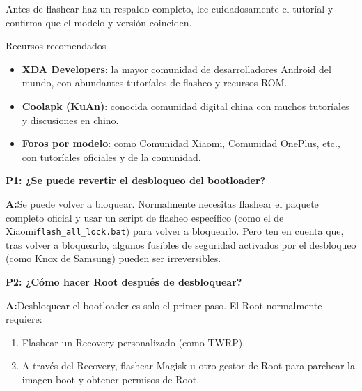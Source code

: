 Antes de flashear haz un respaldo completo, lee cuidadosamente el tutoríal y confirma que el modelo y versión coinciden.

\begin{tcbinfo}{Recursos recomendados}
\begin{itemize}
  \item \textbf{XDA Developers}: la mayor comunidad de desarrolladores Android del mundo, con abundantes tutoríales de flasheo y recursos ROM.
  \item \textbf{Coolapk (KuAn)}: conocida comunidad digital china con muchos tutoríales y discusiones en chino.
  \item \textbf{Foros por modelo}: como Comunidad Xiaomi, Comunidad OnePlus, etc., con tutoríales oficiales y de la comunidad.
\end{itemize}

\end{tcbinfo}


\textbf{P1: ¿Se puede revertir el desbloqueo del bootloader?}\par

\textbf{A:}Se puede volver a bloquear. Normalmente necesitas flashear el paquete completo oficial y usar un script de flasheo específico (como el de Xiaomi\texttt{flash\_all\_lock.\allowbreak bat}) para volver a bloquearlo. Pero ten en cuenta que, tras volver a bloquearlo, algunos fusibles de seguridad activados por el desbloqueo (como Knox de Samsung) pueden ser irreversibles.

\textbf{P2: ¿Cómo hacer Root después de desbloquear?}\par

\textbf{A:}Desbloquear el bootloader es solo el primer paso. El Root normalmente requiere:

\begin{enumerate}
  \item Flashear un Recovery personalizado (como TWRP).
  \item A través del Recovery, flashear Magisk u otro gestor de Root para parchear la imagen boot y obtener permisos de Root.
\end{enumerate}
